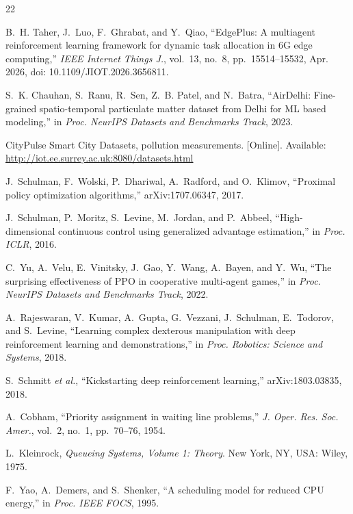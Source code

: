 \documentclass[11pt,journal,onecolumn]{IEEEtran}
\begin{document}
\begin{thebibliography}{22}

B.~H. Taher, J.~Luo, F.~Ghrabat, and Y.~Qiao, ``EdgePlus: A multiagent reinforcement learning framework for dynamic task allocation in 6G edge computing,'' \emph{IEEE Internet Things J.}, vol.~13, no.~8, pp.~15514--15532, Apr. 2026, doi: 10.1109/JIOT.2026.3656811.

S.~K. Chauhan, S.~Ranu, R.~Sen, Z.~B. Patel, and N.~Batra, ``AirDelhi: Fine-grained spatio-temporal particulate matter dataset from Delhi for ML based modeling,'' in \emph{Proc. NeurIPS Datasets and Benchmarks Track}, 2023.

CityPulse Smart City Datasets, pollution measurements. [Online]. Available: \url{http://iot.ee.surrey.ac.uk:8080/datasets.html}

J.~Schulman, F.~Wolski, P.~Dhariwal, A.~Radford, and O.~Klimov, ``Proximal policy optimization algorithms,'' arXiv:1707.06347, 2017.

J.~Schulman, P.~Moritz, S.~Levine, M.~Jordan, and P.~Abbeel, ``High-dimensional continuous control using generalized advantage estimation,'' in \emph{Proc. ICLR}, 2016.

C.~Yu, A.~Velu, E.~Vinitsky, J.~Gao, Y.~Wang, A.~Bayen, and Y.~Wu, ``The surprising effectiveness of PPO in cooperative multi-agent games,'' in \emph{Proc. NeurIPS Datasets and Benchmarks Track}, 2022.

A.~Rajeswaran, V.~Kumar, A.~Gupta, G.~Vezzani, J.~Schulman, E.~Todorov, and S.~Levine, ``Learning complex dexterous manipulation with deep reinforcement learning and demonstrations,'' in \emph{Proc. Robotics: Science and Systems}, 2018.

S.~Schmitt \emph{et al.}, ``Kickstarting deep reinforcement learning,'' arXiv:1803.03835, 2018.

A.~Cobham, ``Priority assignment in waiting line problems,'' \emph{J. Oper. Res. Soc. Amer.}, vol.~2, no.~1, pp.~70--76, 1954.

L.~Kleinrock, \emph{Queueing Systems, Volume 1: Theory}. New York, NY, USA: Wiley, 1975.

F.~Yao, A.~Demers, and S.~Shenker, ``A scheduling model for reduced CPU energy,'' in \emph{Proc. IEEE FOCS}, 1995.


\end{thebibliography}
\end{document}
